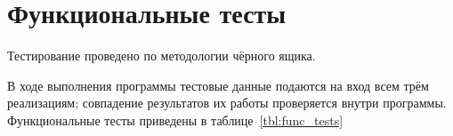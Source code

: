 
\clearpage


\clearpage


\clearpage


\clearpage

\section{Функциональные тесты}

Тестирование проведено по методологии чёрного ящика. 

В ходе выполнения программы тестовые данные подаются на вход всем трём реализациям; совпадение результатов их работы проверяется внутри программы. Функциональные тесты приведены в таблице~\ref{tbl:func_tests}

